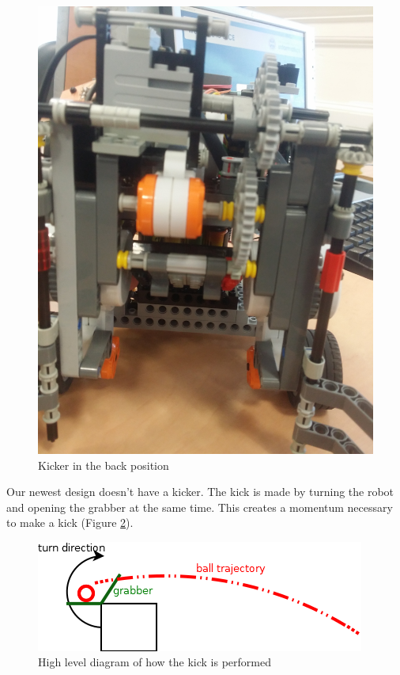 \documentclass[a4paper,12pt]{article}
\begin{document}
\begin{figure}[ht]
\begin{minipage}[b]{.3\textwidth}
	\end{minipage}
	~
	\begin{minipage}[b]{.3\textwidth}
        \centering
		\includegraphics[scale=0.04, angle=-90]{kick_back.jpg}
		\caption{Kicker in the back position}
		\label{fig:kicker_back}
	\end{minipage}
	
\end{figure}

Our newest design doesn't have a kicker. The kick is made by turning  the robot and opening the grabber at the same time. This creates a momentum necessary to make a kick (Figure \ref{fig:kick_action}). 
\begin{figure}
    \includegraphics[scale=.7]{kick}
    \caption{High level diagram of how the kick is performed}
    \label{fig:kick_action}
\end{figure}
\end{document}
